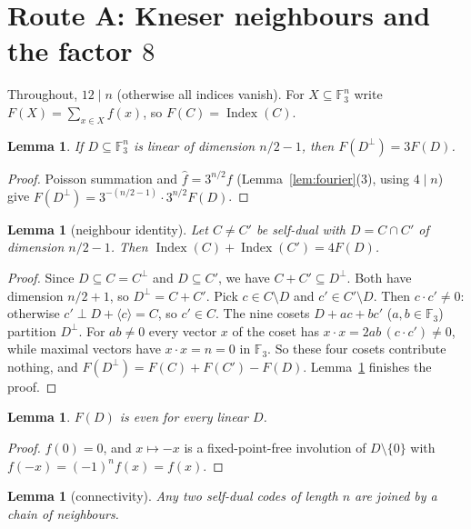 \documentclass[11pt]{amsart}
\newtheorem{lemma}[theorem]{Lemma}
\theoremstyle{definition}
\newcommand{\F}{\mathbb{F}_3}
\newcommand{\Index}{\operatorname{Index}}
\begin{document}
\section{Route A: Kneser neighbours and the factor \texorpdfstring{$8$}{8}}\label{sec:A}

Throughout, $12\mid n$ (otherwise all indices vanish). For $X\subseteq\F^n$ write
$F(X)=\sum_{x\in X}f(x)$, so $F(C)=\Index(C)$.

\begin{lemma}\label{lem:A-poisson}
If $D\subseteq\F^n$ is linear of dimension $n/2-1$, then $F(D^\perp)=3F(D)$.
\end{lemma}

\begin{proof}
Poisson summation and $\hat f=3^{n/2}f$ (Lemma~\ref{lem:fourier}(3), using $4\mid n$) give
$F(D^\perp)=3^{-(n/2-1)}\cdot3^{n/2}F(D)$.
\end{proof}

\begin{lemma}[neighbour identity]\label{lem:A-neighbour}
Let $C\ne C'$ be self-dual with $D=C\cap C'$ of dimension $n/2-1$. Then
$\Index(C)+\Index(C')=4F(D)$.
\end{lemma}

\begin{proof}
Since $D\subseteq C=C^\perp$ and $D\subseteq C'$, we have $C+C'\subseteq D^\perp$. Both have
dimension $n/2+1$, so $D^\perp=C+C'$. Pick $c\in C\setminus D$ and $c'\in C'\setminus D$. Then
$c\cdot c'\ne0$: otherwise $c'\perp D+\langle c\rangle=C$, so $c'\in C$. The nine cosets
$D+ac+bc'$ ($a,b\in\F$) partition $D^\perp$. For $ab\ne0$ every vector $x$ of the coset has
$x\cdot x=2ab\,(c\cdot c')\ne0$, while maximal vectors have $x\cdot x=n=0$ in $\F$. So these four
cosets contribute nothing, and $F(D^\perp)=F(C)+F(C')-F(D)$. Lemma~\ref{lem:A-poisson} finishes the
proof.
\end{proof}

\begin{lemma}\label{lem:A-even}
$F(D)$ is even for every linear $D$.
\end{lemma}

\begin{proof}
$f(0)=0$, and $x\mapsto-x$ is a fixed-point-free involution of $D\setminus\{0\}$ with
$f(-x)=(-1)^nf(x)=f(x)$.
\end{proof}

\begin{lemma}[connectivity]\label{lem:connected}
Any two self-dual codes of length $n$ are joined by a chain of neighbours.
\end{lemma}
\end{document}
